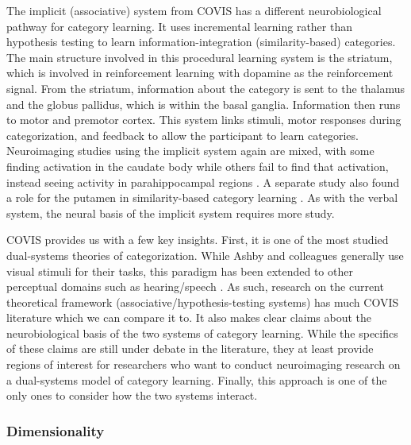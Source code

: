 \documentclass[../dissertation.tex]{subfiles}
\begin{document}
	The implicit (associative) system from COVIS has a different neurobiological pathway for category learning. It uses incremental learning rather than hypothesis testing to learn information-integration (similarity-based) categories. The main structure involved in this procedural learning system is the striatum, which is involved in reinforcement learning with dopamine as the reinforcement signal. From the striatum, information about the category is sent to the thalamus and the globus pallidus, which is within the basal ganglia. Information then runs to motor and premotor cortex. This  system links stimuli, motor responses during categorization, and feedback to allow the participant to learn categories. Neuroimaging studies using the implicit system again are mixed, with some finding activation in the caudate body while others fail to find that activation, instead seeing activity in parahippocampal regions \citep{Nomura2007,Carpenter2016}. A separate study also found a role for the putamen in similarity-based category learning \citep{Waldschmidt2011}. As with the verbal system, the neural basis of the implicit system requires more study. \par
	COVIS provides us with a few key insights. First, it is one of the most studied dual-systems theories of categorization. While Ashby and colleagues generally use visual stimuli for their tasks, this paradigm has been extended to other perceptual domains such as hearing/speech \citep{Chandrasekaran2014, Chandrasekaran2016}. As such, research on the current theoretical framework (associative/hypothesis-testing systems) has much COVIS literature which we can compare it to. It also makes clear claims about the neurobiological basis of the two systems of category learning. While the specifics of these claims are still under debate in the literature, they at least provide regions of interest for researchers who want to conduct neuroimaging research on a dual-systems model of category learning. Finally, this approach is one of the only ones to consider how the two systems interact. \par

	
\subsubsection{Dimensionality}
\end{document}
